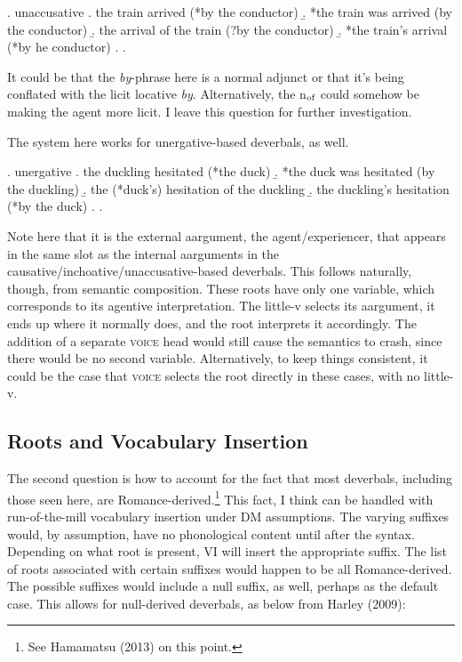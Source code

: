 \documentclass[12pt]{article}
\newcommand*{\textsub}[1]{\ensuremath{_\textrm{{\scriptsize #1}}}}
\begin{document}
\ex. unaccusative
\a. the train arrived (*by the conductor)
\b. *the train was arrived (by the conductor)
\b. the arrival of the train (?by the conductor)
\b. *the train's arrival (*by he conductor)
\z. \z. \par

\doublespacing

It could be that the \textit{by}-phrase here is a normal adjunct or that it's being conflated with the licit locative \textit{by}. Alternatively, the n\textsub{of} could somehow be making the agent more licit. I leave this question for further investigation.

The system here works for unergative-based deverbals, as well.

\singlespacing

\ex. unergative
\a. the duckling hesitated (*the duck)
\b. *the duck was hesitated (by the duckling)
\b. the (*duck's) hesitation of the duckling
\b. the duckling's hesitation (*by the duck)
\z. \z. \par

\doublespacing

Note here that it is the external aargument, the agent/experiencer, that appears in the same slot as the internal aarguments in the causative/inchoative/unaccusative-based deverbals. This follows naturally, though, from semantic composition. These roots have only one variable, which corresponds to its agentive interpretation. The little-v selects its aargument, it ends up where it normally does, and the root interprets it accordingly. The addition of a separate \textsc{voice} head would still cause the semantics to crash, since there would be no second variable. Alternatively, to keep things consistent, it could be the case that \textsc{voice} selects the root directly in these cases, with no little-v.

\subsection{Roots and Vocabulary Insertion}\label{cons2}

The second question is how to account for the fact that most deverbals, including those seen here, are Romance-derived.\footnote{ See Hamamatsu (2013) on this point.} This fact, I think can be handled with run-of-the-mill vocabulary insertion under DM assumptions. The varying suffixes would, by assumption, have no phonological content until after the syntax. Depending on what root is present, VI will insert the appropriate suffix. The list of roots associated with certain suffixes would happen to be all Romance-derived. The possible suffixes would include a null suffix, as well, perhaps as the default case. This allows for null-derived deverbals, as below from Harley (2009):
\end{document}
